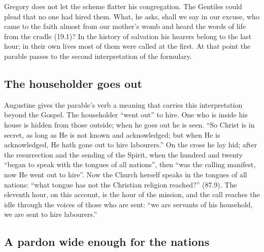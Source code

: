 Gregory does not let the scheme flatter his congregation. The Gentiles could
plead that no one had hired them. What, he asks, shall we say in our excuse,
who came to the faith almost from our mother's womb and heard the words of
life from the cradle (19.1)? In the history of salvation his hearers belong to
the last hour; in their own lives most of them were called at the first. At
that point the parable passes to the second interpretation of the formulary.

\subsection{The householder goes out}

Augustine gives the parable's verb a meaning that carries this interpretation beyond
the Gospel. The householder ``went out'' to hire. One who is inside his house
is hidden from those outside; when he goes out he is seen. ``So Christ is in
secret, as long as He is not known and acknowledged; but when He is
acknowledged, He hath gone out to hire labourers.'' On the cross he lay hid;
after the resurrection and the sending of the Spirit, when the hundred and
twenty ``began to speak with the tongues of all nations'', then ``was the
calling manifest, now He went out to hire''. Now the Church herself speaks in
the tongues of all nations: ``what tongue has not the Christian religion
reached?'' (87.9). The eleventh hour, on this account, is the hour of the
mission, and the call reaches the idle through the voices of those who are
sent: ``we are servants of his household, we are sent to hire labourers.''

\subsection{A pardon wide enough for the nations}

